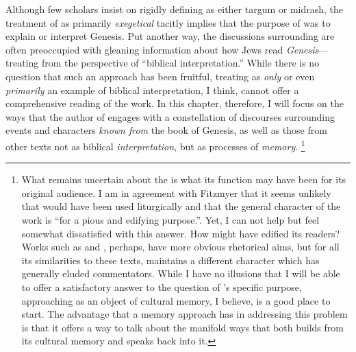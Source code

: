 Although few scholars insist on rigidly defining \ga as either targum or midrash, the treatment of \ga as primarily \emph{exegetical} tacitly implies that the purpose of \ga was to explain or interpret Genesis. Put another way, the discussions surrounding \ga are often preoccupied with gleaning information about how \secondtemple Jews read \emph{Genesis}---treating \ga from the perspective of ``biblical interpretation.'' While there is no question that such an approach has been fruitful, treating \ga as \emph{only} or even \emph{primarily} an example of biblical interpretation, I think, cannot offer a comprehensive reading of the work. In this chapter, therefore, I will focus on the ways that the author of \ga engages with a  constellation of discourses surrounding events and characters \emph{known from} the book of Genesis, as well as those from other texts not as biblical \emph{interpretation}, but as processes of \emph{memory}.%
%
\footnote{What remains uncertain about the \ga is what its function may have been for its original audience. I am in agreement with Fitzmyer that it seems unlikely that \ga would have been used liturgically and that the general character of the work is ``for a pious and edifying purpose.''\textcite[20]{fitzmyer2004}. Yet, I can not help but feel somewhat dissatisfied with this answer. How might \ga have edified its readers? Works such as \jub and \firstenoch, perhaps, have more obvious rhetorical aims, but for all its similarities to these texts, \ga maintains a different character which has generally eluded commentators. While I have no illusions that I will be able to offer a satisfactory answer to the question of \ga's specific purpose, approaching \ga as an object of cultural memory, I believe, is a good place to start. The advantage that a memory approach has in addressing this problem is that it offers a way to talk about the manifold ways that \ga both builds from its cultural memory and speaks back into it.}

